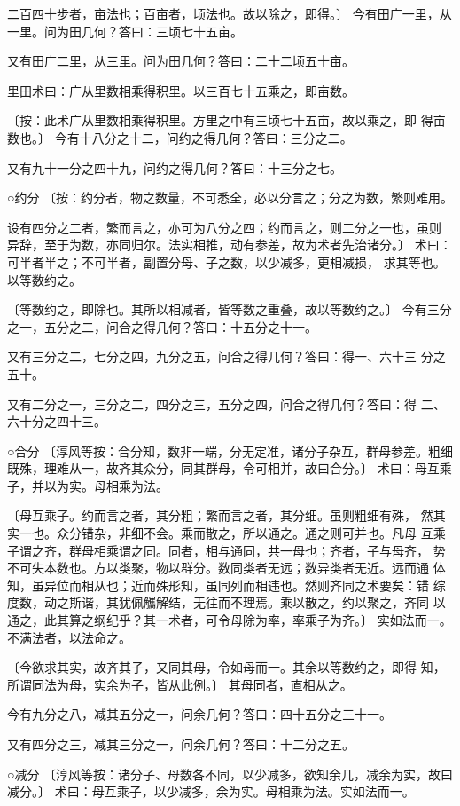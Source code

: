 \documentclass[12pt,UTF8]{ctexbook}
\begin{document}
二百四十步者，亩法也；百亩者，顷法也。故以除之，即得。〕 今有田广一里，从一里。问为田几何？答曰：三顷七十五亩。

又有田广二里，从三里。问为田几何？答曰：二十二顷五十亩。

里田术曰：广从里数相乘得积里。以三百七十五乘之，即亩数。

〔按：此术广从里数相乘得积里。方里之中有三顷七十五亩，故以乘之，即 得亩数也。〕 今有十八分之十二，问约之得几何？答曰：三分之二。

又有九十一分之四十九，问约之得几何？答曰：十三分之七。

○约分 〔按：约分者，物之数量，不可悉全，必以分言之；分之为数，繁则难用。

设有四分之二者，繁而言之，亦可为八分之四；约而言之，则二分之一也，虽则 异辞，至于为数，亦同归尔。法实相推，动有参差，故为术者先治诸分。〕 术曰：可半者半之；不可半者，副置分母、子之数，以少减多，更相减损， 求其等也。以等数约之。

〔等数约之，即除也。其所以相减者，皆等数之重叠，故以等数约之。〕 今有三分之一，五分之二，问合之得几何？答曰：十五分之十一。

又有三分之二，七分之四，九分之五，问合之得几何？答曰：得一、六十三 分之五十。

又有二分之一，三分之二，四分之三，五分之四，问合之得几何？答曰：得 二、六十分之四十三。

○合分 〔淳风等按：合分知，数非一端，分无定准，诸分子杂互，群母参差。粗细 既殊，理难从一，故齐其众分，同其群母，令可相并，故曰合分。〕 术曰：母互乘子，并以为实。母相乘为法。

〔母互乘子。约而言之者，其分粗；繁而言之者，其分细。虽则粗细有殊， 然其实一也。众分错杂，非细不会。乘而散之，所以通之。通之则可并也。凡母 互乘子谓之齐，群母相乘谓之同。同者，相与通同，共一母也；齐者，子与母齐， 势不可失本数也。方以类聚，物以群分。数同类者无远；数异类者无近。远而通 体知，虽异位而相从也；近而殊形知，虽同列而相违也。然则齐同之术要矣：错 综度数，动之斯谐，其犹佩觿解结，无往而不理焉。乘以散之，约以聚之，齐同 以通之，此其算之纲纪乎？其一术者，可令母除为率，率乘子为齐。〕 实如法而一。不满法者，以法命之。

〔今欲求其实，故齐其子，又同其母，令如母而一。其余以等数约之，即得 知，所谓同法为母，实余为子，皆从此例。〕 其母同者，直相从之。

今有九分之八，减其五分之一，问余几何？答曰：四十五分之三十一。

又有四分之三，减其三分之一，问余几何？答曰：十二分之五。

○减分 〔淳风等按：诸分子、母数各不同，以少减多，欲知余几，减余为实，故曰 减分。〕 术曰：母互乘子，以少减多，余为实。母相乘为法。实如法而一。
\end{document}
